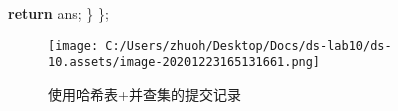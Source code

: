 \documentclass[]{article}
\newenvironment{Shaded}{}{}
\newcommand{\ControlFlowTok}[1]{\textcolor[rgb]{0.00,0.44,0.13}{\textbf{#1}}}
\newcommand{\NormalTok}[1]{#1}
\begin{document}
\begin{Shaded}
\begin{Highlighting}[]
        \ControlFlowTok{return}\NormalTok{ ans;}
\NormalTok{    \}}
\NormalTok{\};}
\end{Highlighting}
\end{Shaded}

\begin{figure}
\centering
\texttt{[image: C:/Users/zhuoh/Desktop/Docs/ds-lab10/ds-10.assets/image-20201223165131661.png]}
\caption{使用哈希表+并查集的提交记录}
\end{figure}
\end{document}
